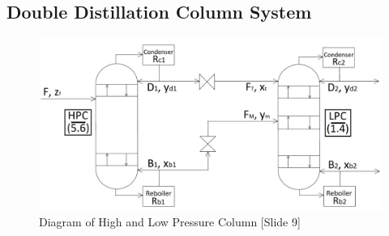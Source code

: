     \newpage
    
    \subsection{Double Distillation Column System}
    \begin{figure}[ht]
        \centering
        \includegraphics[width=0.9\linewidth]{airseparation/handouts/graphics/labelled_columns_diagram_simple.jpg}
        \caption{Diagram of High and Low Pressure Column [Slide 9]}
        \label{fig:column_linkage}
    \end{figure}
    \hfill
    \hfill
